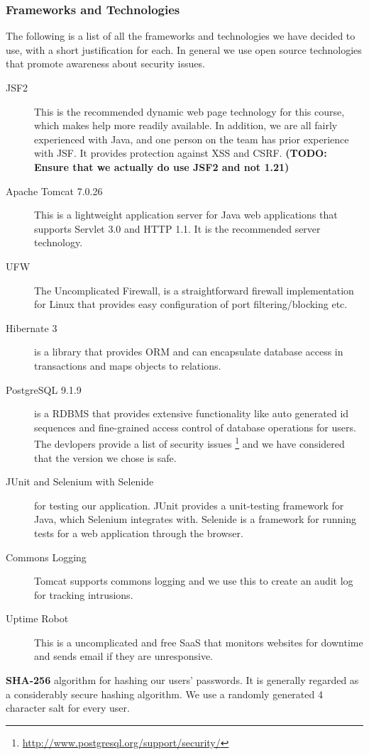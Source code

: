 \documentclass[a4paper]{article}
\begin{document}
\subsubsection{Frameworks and Technologies}
The following is a list of all the frameworks and technologies we have decided to use, with a short justification for each. In general we use open source technologies that promote awareness about security issues.
\begin{description}
\item[JSF2] This is the recommended dynamic web page technology for this course, which makes help more readily available. In addition, we are all fairly experienced with Java, and one person on the team has prior experience with JSF. It provides protection against XSS and CSRF. \textbf{(TODO: Ensure that we actually do use JSF2 and not 1.21)}
\item[Apache Tomcat 7.0.26] This is a lightweight application server for Java web applications that supports Servlet 3.0 and HTTP 1.1. It is the recommended server technology. 
\item[UFW] The Uncomplicated Firewall, is a straightforward firewall implementation for Linux that provides easy configuration of port filtering/blocking etc.
\item[Hibernate 3] is a library that provides ORM and can encapsulate database access in transactions and maps objects to relations.
\item[PostgreSQL 9.1.9] is a RDBMS that provides extensive functionality like auto generated id sequences and fine-grained access control of database operations for users. The devlopers provide a list of security issues \footnote{\href{http://www.postgresql.org/support/security/}{http://www.postgresql.org/support/security/}} and we have considered that the version we chose is safe.
\item[JUnit and Selenium with Selenide] for testing our application. JUnit provides a unit-testing framework for Java, which Selenium integrates with. Selenide is a framework for running tests for a web application through the browser.
\item[Commons Logging]
Tomcat supports commons logging and we use this to create an audit log for tracking intrusions.
\item[Uptime Robot] This is a uncomplicated and free SaaS that monitors websites for downtime and sends email if they are unresponsive.
\end{description}


\textbf{SHA-256} algorithm for hashing our users' passwords. It is generally regarded as a considerably secure hashing algorithm.
We use a randomly generated 4 character salt for every user.
\end{document}
